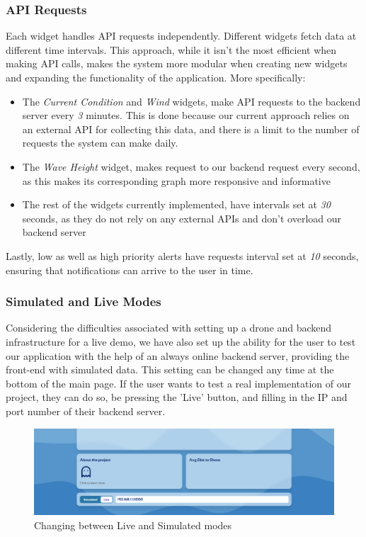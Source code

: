 \documentclass{article}
\begin{document}
    \subsubsection{API Requests}
    Each widget handles API requests independently. Different widgets fetch data at different time intervals. This approach, while it isn't the most efficient when making API calls, makes the system more modular when creating new widgets and expanding the functionality of the application. More specifically:
    \begin{itemize}
        \item The \textit{Current Condition} and \textit{Wind} widgets, make API requests to the backend server every \textit{3} minutes. This is done because our current approach relies on an external API for collecting this data, and there is a limit to the number of requests the system can make daily.
        \item The \textit{Wave Height} widget, makes request to our backend request every second, as this makes its corresponding graph more responsive and informative
        \item The rest of the widgets currently implemented, have intervals set at \textit{30} seconds, as they do not rely on any external APIs and don't overload our backend server
    \end{itemize}
    Lastly, low as well as high priority alerts have requests interval set at \textit{10} seconds, ensuring that notifications can arrive to the user in time.
    
    \subsubsection{Simulated and Live Modes}
    Considering the difficulties associated with setting up a drone and backend infrastructure for a live demo, we have also set up the ability for the user to test our application with the help of an always online backend server, providing the front-end with simulated data. This setting can be changed any time at the bottom of the main page. If the user wants to test a real implementation of our project, they can do so, be pressing the 'Live' button, and filling in the IP and port number of their backend server.
    \begin{figure}[h]
        \centering
        \includegraphics[width=0.75\linewidth]{assets/FE_F5.png}
        \caption{Changing between Live and Simulated modes}
        \label{fig:simulated}
    \end{figure}
\end{document}
